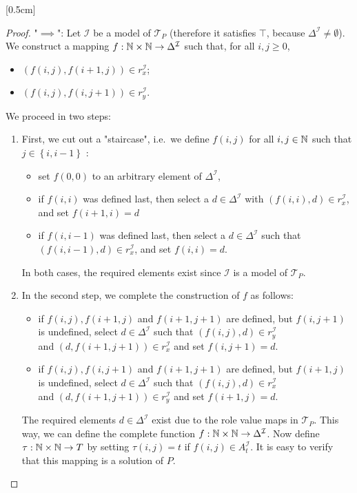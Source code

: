[0.5cm]
\begin{proof}
	"$ \implies$":
	Let $\mathcal{I}$ be a model of $\mathcal{T}_P$ (therefore it satisfies $\top$, because $\Delta^\mathcal{I} \neq \emptyset$).
	We construct a mapping $f: \mathbb{N} \times \mathbb{N} \to \Delta^\mathcal{I}$ such that,
	for all $i, j \geq 0$,
	\begin{itemize}
		\item $\left(f(i,j), f(i+1,j)\right) \in r_x^\mathcal{I}$;
		\item $\left(f(i,j), f(i, j+1)\right) \in r_y^\mathcal{I}$.
	\end{itemize}
	We proceed in two steps:
	\begin{enumerate}
		\item First, we cut out a "staircase", i.e.\ we define $f(i,j)$ for all $i,j \in \mathbb{N}$
			such that $j \in \left\{ i, i-1 \right\}$ :
			\begin{itemize}
				\item set $f(0,0)$ to an arbitrary element of $\Delta^\mathcal{I}$,
				\item if $f(i, i)$ was defined last, then select a $d \in \Delta^\mathcal{I}$
					with $\left(f(i,i),d\right) \in r_x^\mathcal{I}$,
					and set $f(i+1,i) = d$
				\item if $f(i, i-1)$ was defined last, then select a $d \in \Delta^\mathcal{I}$
					such that $\left( f(i, i-1), d \right) \in r_x^\mathcal{I}$,
					and set $f(i,i) = d$.
			\end{itemize}
			In both cases, the required elements exist since $\mathcal{I}$ is a model of $\mathcal{T}_P$.
		\item In the second step, we complete the construction of $f$ as follows:
			\begin{itemize}
				\item if $f(i,j), f(i+1, j)$ and $f(i+1, j+1) $ are defined,
					but $f(i, j+1)$ is undefined, select $d \in \Delta^\mathcal{I}$
					such that $\left(f(i,j), d \right) \in r_y^\mathcal{I}$\\
					and $\left( d, f(i+1,j+1) \right) \in r_x^\mathcal{I}$
					and set $f(i, j+1) = d$.
				\item if $f(i,j), f(i,j+1)$ and $f(i+1, j+1)$ are defined,
					but $f(i+1, j)$ is undefined, select $d \in \Delta^\mathcal{I}$
					such that $\left( f(i,j), d \right) \in r_x^\mathcal{I}$\\
					and $\left( d, f(i+1, j+1) \right) \in r_y^\mathcal{I}$
					and set $f(i + 1, j) = d$.
			\end{itemize}
			The required elements $d \in \Delta^\mathcal{I}$ exist due to the role value maps in $\mathcal{T}_P$.
			This way, we can define the complete function $f: \mathbb{N} \times \mathbb{N} \to \Delta^\mathcal{I}$.
			Now define $\tau: \mathbb{N} \times \mathbb{N} \to T$ by setting $\tau(i,j) = t$ if
			$f(i,j) \in A_t^\mathcal{I}$.
			It is easy to verify that this mapping is a solution of $P$.
	\end{enumerate}


\end{proof}
